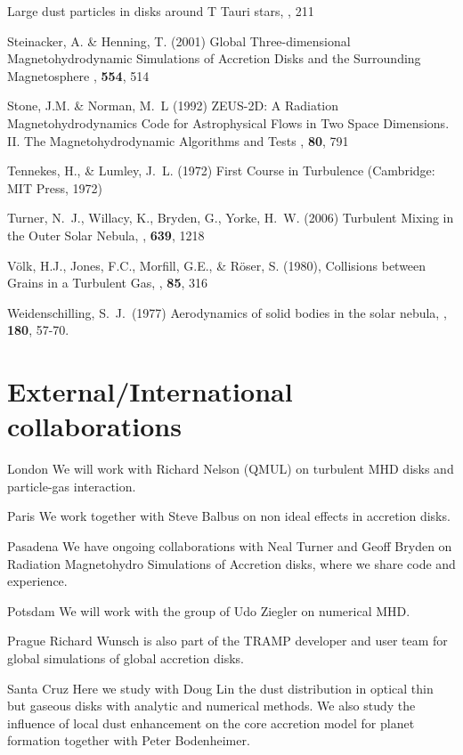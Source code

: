 \begin{literature}
  Large dust particles in disks around T Tauri stars,
  , 211
\item Steinacker, A. \& Henning, T. (2001)
  Global Three-dimensional Magnetohydrodynamic Simulations of Accretion Disks
 and the Surrounding Magnetosphere
  \apj, \textbf{554}, 514
\item Stone, J.M. \& Norman, M.~L (1992)
  ZEUS-2D: A Radiation Magnetohydrodynamics Code for Astrophysical Flows
  in Two Space Dimensions. II. The Magnetohydrodynamic Algorithms and Tests
  \apjs, \textbf{80}, 791
%
\item Tennekes, H., \& Lumley, J.~L. (1972) First Course in Turbulence
      (Cambridge: MIT Press, 1972)
\item Turner, N.~J., Willacy, K., Bryden, G., Yorke, H.~W. (2006)
   Turbulent Mixing in the Outer Solar Nebula,
  \apj,  {\bf 639}, 1218
\item V\"olk, H.J., Jones, F.C., Morfill, G.E., \& R\"oser, S. (1980),
  Collisions between Grains in a Turbulent Gas, 
  \aap, {\bf 85}, 316   %
%
\item Weidenschilling, S.~J.\ (1977) Aerodynamics of solid bodies in the solar nebula,
  \mn, {\bf 180}, 57-70. 
%
\end{literature}
%
\section{External/International collaborations}
\begin{collablist}
\item[London] We will work with Richard Nelson (QMUL) on turbulent MHD disks and particle-gas interaction.
\item[Paris] We work together with Steve Balbus on non ideal effects in accretion disks.
\item[Pasadena] We have ongoing collaborations with Neal Turner and Geoff Bryden
on Radiation Magnetohydro Simulations of Accretion disks, where we share code and experience.
\item[Potsdam] We will work with the group of Udo Ziegler on numerical MHD.
\item[Prague] Richard Wunsch is also part of the TRAMP developer and user team for
  global simulations of global accretion disks.
\item[Santa Cruz] Here we study with Doug Lin the dust distribution in optical thin but gaseous disks
with analytic and numerical methods. We also study the influence
of local dust enhancement on the core accretion model for planet formation together with Peter Bodenheimer.
\end{collablist}
%
%
